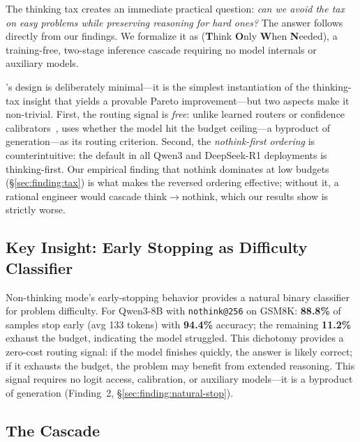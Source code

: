 
The thinking tax creates an immediate practical question: \emph{can we avoid the tax on easy problems while preserving reasoning for hard ones?}
The answer follows directly from our findings.
We formalize it as \method{} (\textbf{T}hink \textbf{O}nly \textbf{W}hen \textbf{N}eeded), a training-free, two-stage inference cascade requiring no model internals or auxiliary models.

\method{}'s design is deliberately minimal---it is the simplest instantiation of the thinking-tax insight that yields a provable Pareto improvement---but two aspects make it non-trivial.
First, the routing signal is \emph{free}: unlike learned routers or confidence calibrators~\citep{chen2023frugalgpt}, \method{} uses whether the model hit the budget ceiling---a byproduct of generation---as its routing criterion.
Second, the \emph{nothink-first ordering} is counterintuitive: the default in all Qwen3 and DeepSeek-R1 deployments is thinking-first.
Our empirical finding that nothink dominates at low budgets (\S\ref{sec:finding:tax}) is what makes the reversed ordering effective; without it, a rational engineer would cascade think$\to$nothink, which our results show is strictly worse.

\subsection{Key Insight: Early Stopping as Difficulty Classifier}
\label{sec:method:insight}

Non-thinking mode's early-stopping behavior provides a natural binary classifier for problem difficulty.
For Qwen3-8B with \texttt{nothink@256} on GSM8K: \textbf{88.8\%} of samples stop early (avg 133 tokens) with \textbf{94.4\%} accuracy; the remaining \textbf{11.2\%} exhaust the budget, indicating the model struggled.
This dichotomy provides a zero-cost routing signal: if the model finishes quickly, the answer is likely correct; if it exhausts the budget, the problem may benefit from extended reasoning.
This signal requires no logit access, calibration, or auxiliary models---it is a byproduct of generation (Finding~2, \S\ref{sec:finding:natural-stop}).

\subsection{The \method{} Cascade}
\label{sec:method:cascade}

